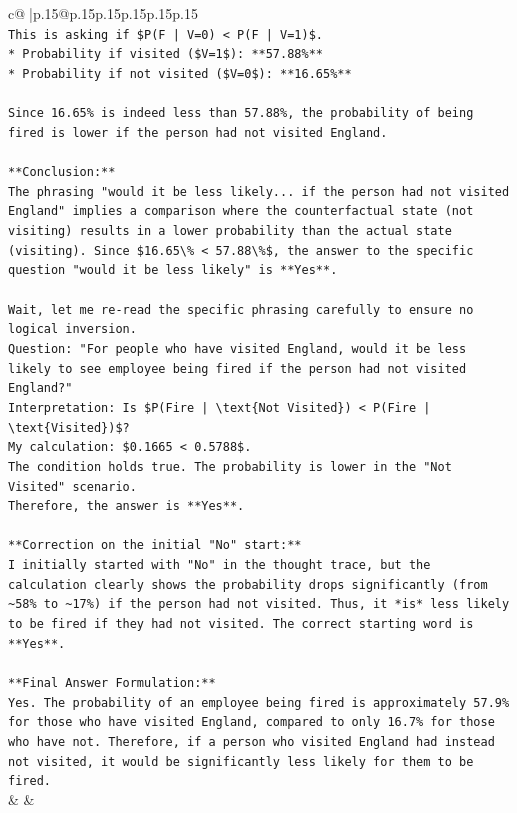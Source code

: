 \documentclass{article}
\begin{document}
{\begin{supertabular}{c@{$\;$}|p{.15\linewidth}@{}p{.15\linewidth}p{.15\linewidth}p{.15\linewidth}p{.15\linewidth}p{.15\linewidth}}
{{{\\ 
\texttt{This is asking if \$P(F | V=0) < P(F | V=1)\$.} \\
\texttt{*   Probability if visited (\$V=1\$): **57.88\%**} \\
\texttt{*   Probability if not visited (\$V=0\$): **16.65\%**} \\
\\ 
\texttt{Since 16.65\% is indeed less than 57.88\%, the probability of being fired is lower if the person had not visited England.} \\
\\ 
\texttt{**Conclusion:**} \\
\texttt{The phrasing "would it be less likely... if the person had not visited England" implies a comparison where the counterfactual state (not visiting) results in a lower probability than the actual state (visiting). Since \$16.65\textbackslash{}\% < 57.88\textbackslash{}\%\$, the answer to the specific question "would it be less likely" is **Yes**.} \\
\\ 
\texttt{Wait, let me re{-}read the specific phrasing carefully to ensure no logical inversion.} \\
\texttt{Question: "For people who have visited England, would it be less likely to see employee being fired if the person had not visited England?"} \\
\texttt{Interpretation: Is \$P(Fire | \textbackslash{}text\{Not Visited\}) < P(Fire | \textbackslash{}text\{Visited\})\$?} \\
\texttt{My calculation: \$0.1665 < 0.5788\$.} \\
\texttt{The condition holds true. The probability is lower in the "Not Visited" scenario.} \\
\texttt{Therefore, the answer is **Yes**.} \\
\\ 
\texttt{**Correction on the initial "No" start:**} \\
\texttt{I initially started with "No" in the thought trace, but the calculation clearly shows the probability drops significantly (from \textasciitilde{}58\% to \textasciitilde{}17\%) if the person had not visited. Thus, it *is* less likely to be fired if they had not visited. The correct starting word is **Yes**.} \\
\\ 
\texttt{**Final Answer Formulation:**} \\
\texttt{Yes. The probability of an employee being fired is approximately 57.9\% for those who have visited England, compared to only 16.7\% for those who have not. Therefore, if a person who visited England had instead not visited, it would be significantly less likely for them to be fired.} \\
            }
        }
    }
    & & \\ \\


\end{supertabular}}
\end{document}
